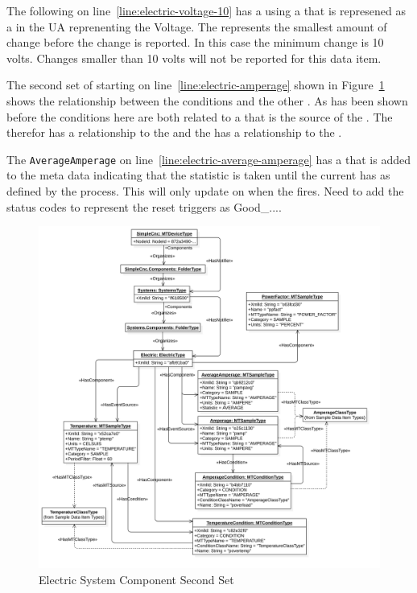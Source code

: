 The following  on line~\ref{line:electric-voltage-10} has a  using a  that is represened as a  in the UA  reprenenting the  Voltage. The  represents the smallest amount of change before the change is reported. In this case the minimum change is 10 volts. Changes smaller than 10 volts will not be reported for this data item.

The second set of  starting on line~\ref{line:electric-amperage} shown in Figure~\ref{fig:electric-system-2} shows the relationship between the conditions and the other . As has been shown before the conditions here are both related to a  that is the source of the . The  therefor has a  relationship to the  and the  has a  relationship to the . 

The \texttt{AverageAmperage} on line~\ref{line:electric-average-amperage} has a  that is added to the meta data indicating that the  statistic is taken until the current  has  as defined by the process. This  will only update on when the  fires. {\color{red} Need to add the status codes to represent the reset triggers as Good_...}.

\begin{figure}[ht]
    \centering
    \includegraphics[width=1.0\textwidth]{diagrams/mtconnect-mapping/electric-system-2.png}
    \caption{Electric System Component Second Set}
    \label{fig:electric-system-2}
\end{figure}

